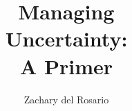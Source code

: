\documentclass{tufte-book}
\title{Managing\\ \noindent Uncertainty:\\ \noindent A Primer}
\author[del Rosario]{Zachary del Rosario}
\newcommand{\onlyinsubfile}[1]{#1}
\newcommand{\notinsubfile}[1]{}
\begin{document}
\renewcommand{\onlyinsubfile}[1]{}
\renewcommand{\notinsubfile}[1]{#1}

\frontmatter
\maketitle


\tableofcontents




\backmatter




\printindex
\end{document}
